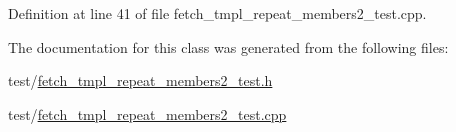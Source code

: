 Definition at line 41 of file fetch\+\_\+tmpl\+\_\+repeat\+\_\+members2\+\_\+test.\+cpp.



The documentation for this class was generated from the following files\+:\begin{DoxyCompactItemize}
\item 
test/\hyperlink{fetch__tmpl__repeat__members2__test_8h}{fetch\+\_\+tmpl\+\_\+repeat\+\_\+members2\+\_\+test.\+h}\item 
test/\hyperlink{fetch__tmpl__repeat__members2__test_8cpp}{fetch\+\_\+tmpl\+\_\+repeat\+\_\+members2\+\_\+test.\+cpp}\end{DoxyCompactItemize}
